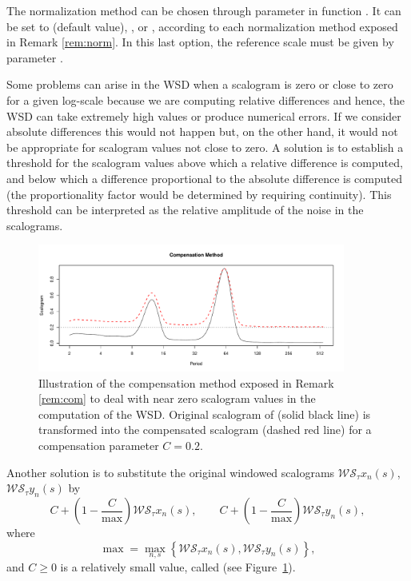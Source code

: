 The normalization method can be chosen through parameter  in function . It can be set to  (default value), ,  or , according to each normalization method exposed in Remark \ref{rem:norm}. In this last option, the reference scale must be given by parameter .

\begin{rmk}
\label{rem:com}
Some problems can arise in the WSD when a scalogram is zero or close to zero for a given log-scale because we are computing relative differences and hence, the WSD can take extremely high values or produce numerical errors. If we consider absolute differences this would not happen but, on the other hand, it would not be appropriate for scalogram values not close to zero.
A solution is to establish a threshold for the scalogram values above which a relative difference is computed, and below which a difference proportional to the absolute difference is computed (the proportionality factor would be determined by requiring continuity). This threshold can be interpreted as the relative amplitude of the noise in the scalograms.

\begin{figure}[tbp]
\begin{center}
  \includegraphics[width=0.9\textwidth]{Figure6}
\end{center}
\caption{Illustration of the compensation method exposed in Remark \ref{rem:com} to deal with near zero scalogram values in the computation of the WSD. Original scalogram of  (solid black line) is transformed into the compensated scalogram (dashed red line) for a compensation parameter $C=0.2$.}
\label{fig:comp}
\end{figure}

Another solution is to substitute the original windowed scalograms $\mathcal{WS}_{\tau }x_n(s)$, $\mathcal{WS}_{\tau }y_n(s)$ by 
\begin{equation}
\label{eq:comp}
C+\left( 1-\frac{C}{\max}\right) \mathcal{WS}_{\tau }x_n(s), \qquad C+\left( 1-\frac{C}{\max}\right) \mathcal{WS}_{\tau }y_n(s),
\end{equation}
where
\[
\max =\max _{n,s}\left\{ \mathcal{WS}_{\tau }x_n(s),\mathcal{WS}_{\tau }y_n(s)\right\} ,
\]
and $C\geq 0$ is a relatively small value, called  (see Figure~\ref{fig:comp}).
\end{rmk}

